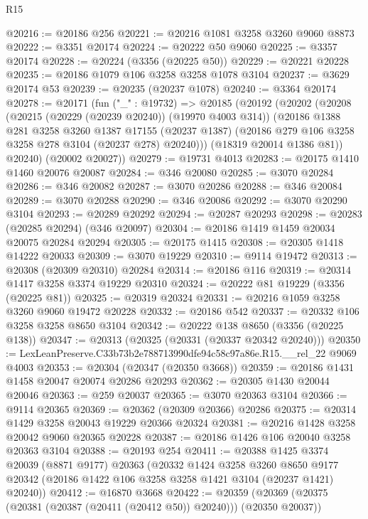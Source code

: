 \begin{lexlean}{R15}
\begin{coremodule}
@20216 := @20186 @256
@20221 := @20216 @1081 @3258 @3260 @9060 @8873
@20222 := @3351 @20174
@20224 := @20222 @50 @9060
@20225 := @3357 @20174
@20228 := @20224 (@3356 (@20225 @50))
@20229 := @20221 @20228
@20235 := @20186 @1079 @106 @3258 @3258 @1078 @3104
@20237 := @3629 @20174 @53
@20239 := @20235 (@20237 @1078)
@20240 := @3364 @20174
@20278 := @20171
    (fun ("_" : @19732) =>
    @20185
      (@20192
        (@20202
          (@20208
            (@20215 (@20229 (@20239 @20240)) (@19970 @4003 @314))
            (@20186
              @1388
              @281
              @3258
              @3260
              @1387
              @17155
              (@20237 @1387)
              (@20186 @279 @106 @3258 @3258 @278 @3104 (@20237 @278) @20240)))
          (@18319 @20014 @1386 @81))
        @20240)
      (@20002 @20027))
@20279 := @19731 @4013
@20283 := @20175 @1410 @1460 @20076 @20087
@20284 := @346 @20080
@20285 := @3070 @20284
@20286 := @346 @20082
@20287 := @3070 @20286
@20288 := @346 @20084
@20289 := @3070 @20288
@20290 := @346 @20086
@20292 := @3070 @20290 @3104
@20293 := @20289 @20292
@20294 := @20287 @20293
@20298 := @20283 (@20285 @20294) (@346 @20097)
@20304 := @20186 @1419 @1459 @20034 @20075 @20284 @20294
@20305 := @20175 @1415
@20308 := @20305 @1418 @14222 @20033
@20309 := @3070 @19229
@20310 := @9114 @19472
@20313 := @20308 (@20309 @20310) @20284
@20314 := @20186 @116
@20319 := @20314 @1417 @3258 @3374 @19229 @20310
@20324 := @20222 @81 @19229 (@3356 (@20225 @81))
@20325 := @20319 @20324
@20331 := @20216 @1059 @3258 @3260 @9060 @19472 @20228
@20332 := @20186 @542
@20337 := @20332 @106 @3258 @3258 @8650 @3104
@20342 := @20222 @138 @8650 (@3356 (@20225 @138))
@20347 := @20313 (@20325 (@20331 (@20337 @20342 @20240)))
@20350 := LexLeanPreserve.C33b73b2e788713990dfe94c58c97a86e.R15.__rel_22 @9069 @4003
@20353 := @20304 (@20347 (@20350 @3668))
@20359 := @20186 @1431 @1458 @20047 @20074 @20286 @20293
@20362 := @20305 @1430 @20044 @20046
@20363 := @259 @20037
@20365 := @3070 @20363 @3104
@20366 := @9114 @20365
@20369 := @20362 (@20309 @20366) @20286
@20375 := @20314 @1429 @3258 @20043 @19229 @20366 @20324
@20381 := @20216 @1428 @3258 @20042 @9060 @20365 @20228
@20387 := @20186 @1426 @106 @20040 @3258 @20363 @3104
@20388 := @20193 @254
@20411 := @20388
    @1425
    @3374
    @20039
    (@8871 @9177)
    @20363
    (@20332
      @1424
      @3258
      @3260
      @8650
      @9177
      @20342
      (@20186 @1422 @106 @3258 @3258 @1421 @3104 (@20237 @1421) @20240))
@20412 := @16870 @3668
@20422 := @20359 (@20369 (@20375 (@20381 (@20387 (@20411 (@20412 @50)) @20240))) (@20350 @20037))

\end{coremodule}
\end{lexlean}
